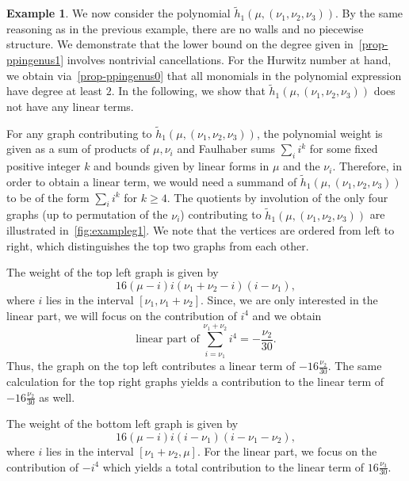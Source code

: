 \documentclass[10pt]{amsart}
\theoremstyle{plain}
\theoremstyle{definition}
\theoremstyle{definition}
\newtheorem{exam}[exam]{Example}
\theoremstyle{plain}
\theoremstyle{plain}
\theoremstyle{remark}
\theoremstyle{plain}
\theoremstyle{plain}
\begin{document}
\begin{exam}\label{ex-linearpart}
We now consider the polynomial $\tilde{h}_1(\mu,(\nu_1,\nu_2,\nu_3))$. By the same reasoning as in the previous example, there are no walls and no piecewise structure. We demonstrate that the lower bound on the degree given in~\cref{prop-ppingenus1} involves nontrivial cancellations. For the Hurwitz number at hand, we obtain via~\cref{prop-ppingenus0} that all monomials in the polynomial expression have degree at least $2$. In the following, we show that $\tilde{h}_1(\mu,(\nu_1,\nu_2,\nu_3))$ does not have any linear terms.

For any graph contributing to $\tilde{h}_1(\mu,(\nu_1,\nu_2,\nu_3))$, the polynomial weight is given as a sum of products of $\mu,\nu_i$ and Faulhaber sums $\sum_i i^k$ for some fixed positive integer $k$ and bounds given by linear forms in $\mu$ and the $\nu_i$. Therefore, in order to obtain a linear term, we would need a summand of $\tilde{h}_1(\mu,(\nu_1,\nu_2,\nu_3))$ to be of the form $\sum_i i^k$ for $k\ge 4$. The quotients by involution of the only four graphs (up to permutation of the $\nu_i$) contributing to $\tilde{h}_1(\mu,(\nu_1,\nu_2,\nu_3))$ are illustrated in~\cref{fig:exampleg1}. We note that the vertices are ordered from left to right, which distinguishes the top two graphs from each other.

The weight of the top left graph is given by
\begin{equation*}
    16(\mu-i)i(\nu_1+\nu_2-i)(i-\nu_1),
\end{equation*}
where $i$ lies in the interval $[\nu_1,\nu_1+\nu_2]$.
Since, we are only interested in the linear part, we will focus on the contribution of $i^4$ and we obtain
\begin{equation*}
    \textrm{linear part of}\,\sum_{i=\nu_1}^{\nu_1+\nu_2}i^4=-\frac{\nu_2}{30}.
\end{equation*}
Thus, the graph on the top left contributes a linear term of $-16\frac{\nu_2}{30}$.
The same calculation for the top right graphs yields a contribution to the linear term of $-16\frac{\nu_2}{30}$ as well.

The weight of the bottom left graph is given by
\begin{equation*}
    16(\mu-i)i(i-\nu_1)(i-\nu_1-\nu_2),
\end{equation*}
where $i$ lies in the interval $[\nu_1+\nu_2,\mu]$. For the linear part, we focus on the contribution of $-i^4$ which yields a total contribution to the linear term of $16\frac{\nu_3}{30}$.


\end{exam}
\end{document}
